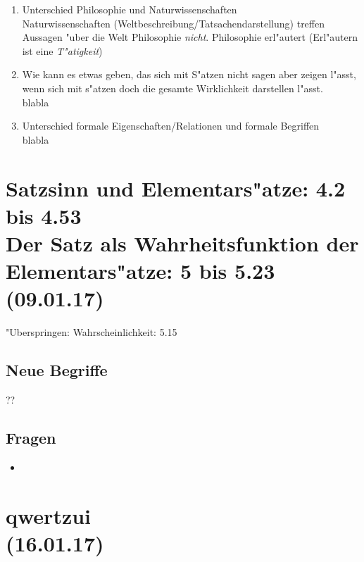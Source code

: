\documentclass[emulatestandardclasses]{scrartcl}
\begin{document}
\begin{enumerate}
  \item {\color{NavyBlue}Unterschied Philosophie und Naturwissenschaften}\\
{\color{ForestGreen} Naturwissenschaften (Weltbeschreibung/Tatsachendarstellung) treffen Aussagen "uber die Welt Philosophie \emph{nicht}. Philosophie erl"autert (Erl"autern ist eine \emph{T"atigkeit})}
  \item {\color{NavyBlue} Wie kann es etwas geben, das sich mit S"atzen nicht sagen aber zeigen l"asst, wenn sich mit s"atzen doch die gesamte Wirklichkeit darstellen l"asst.}\\
{\color{ForestGreen} blabla}
    \item {\color{NavyBlue} Unterschied formale Eigenschaften/Relationen und formale Begriffen}\\
{\color{ForestGreen} blabla}
\end{enumerate}


\section{Satzsinn und Elementars"atze: 4.2 bis 4.53\\Der Satz als Wahrheitsfunktion der Elementars"atze: 5 bis 5.23\\(09.01.17)}

"Uberspringen: Wahrscheinlichkeit: 5.15

\vspace{10pt}
\subsection{Neue Begriffe}

\begin{description}[leftmargin=!,labelwidth=\widthof{\bfseries Sachverhalt}]
  \item[Logischer Atomismus] ??
\end{description}

\subsection{Fragen}

\begin{itemize}
  \item 
\end{itemize}


\section{qwertzui\\(16.01.17)}
\end{document}
